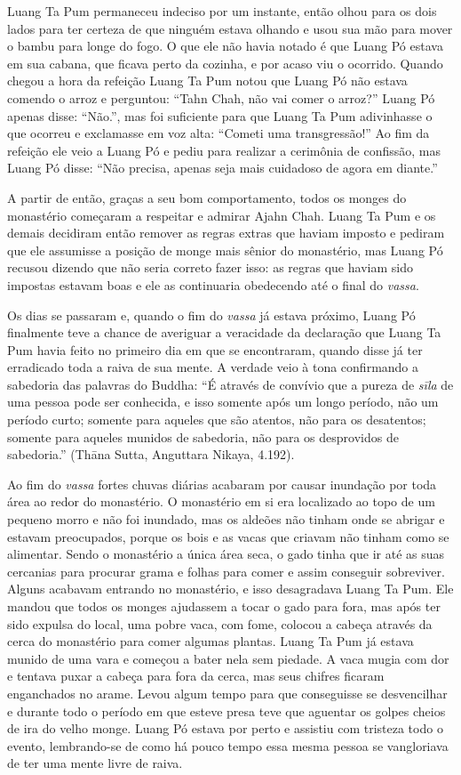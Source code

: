 Luang Ta Pum permaneceu indeciso por um instante, então olhou para os
dois lados para ter certeza de que ninguém estava olhando e usou sua mão
para mover o bambu para longe do fogo. O que ele não havia notado é que
Luang Pó estava em sua cabana, que ficava perto da cozinha, e por acaso
viu o ocorrido. Quando chegou a hora da refeição Luang Ta Pum notou que
Luang Pó não estava comendo o arroz e perguntou: ``Tahn Chah, não vai
comer o arroz?'' Luang Pó apenas disse: ``Não.'', mas foi suficiente
para que Luang Ta Pum adivinhasse o que ocorreu e exclamasse em voz
alta: ``Cometi uma transgressão!'' Ao fim da refeição ele veio a Luang
Pó e pediu para realizar a cerimônia de confissão, mas Luang Pó disse:
``Não precisa, apenas seja mais cuidadoso de agora em diante.''

A partir de então, graças a seu bom comportamento, todos os monges do
monastério começaram a respeitar e admirar Ajahn Chah. Luang Ta Pum e os
demais decidiram então remover as regras extras que haviam imposto e
pediram que ele assumisse a posição de monge mais sênior do monastério,
mas Luang Pó recusou dizendo que não seria correto fazer isso: as regras
que haviam sido impostas estavam boas e ele as continuaria obedecendo
até o final do \emph{vassa}.

Os dias se passaram e, quando o fim do \emph{vassa} já estava próximo,
Luang Pó finalmente teve a chance de averiguar a veracidade da
declaração que Luang Ta Pum havia feito no primeiro dia em que se
encontraram, quando disse já ter erradicado toda a raiva de sua mente. A
verdade veio à tona confirmando a sabedoria das palavras do Buddha: ``É
através de convívio que a pureza de \emph{sīla} de uma pessoa pode ser
conhecida, e isso somente após um longo período, não um período curto;
somente para aqueles que são atentos, não para os desatentos; somente
para aqueles munidos de sabedoria, não para os desprovidos de
sabedoria.'' (Thāna Sutta, Anguttara Nikaya, 4.192).

Ao fim do \emph{vassa} fortes chuvas diárias acabaram por causar
inundação por toda área ao redor do monastério. O monastério em si era
localizado ao topo de um pequeno morro e não foi inundado, mas os
aldeões não tinham onde se abrigar e estavam preocupados, porque os bois
e as vacas que criavam não tinham como se alimentar. Sendo o monastério
a única área seca, o gado tinha que ir até as suas cercanias para
procurar grama e folhas para comer e assim conseguir sobreviver. Alguns
acabavam entrando no monastério, e isso desagradava Luang Ta Pum. Ele
mandou que todos os monges ajudassem a tocar o gado para fora, mas após
ter sido expulsa do local, uma pobre vaca, com fome, colocou a cabeça
através da cerca do monastério para comer algumas plantas. Luang Ta Pum
já estava munido de uma vara e começou a bater nela sem piedade. A vaca
mugia com dor e tentava puxar a cabeça para fora da cerca, mas seus
chifres ficaram enganchados no arame. Levou algum tempo para que
conseguisse se desvencilhar e durante todo o período em que esteve presa
teve que aguentar os golpes cheios de ira do velho monge. Luang Pó
estava por perto e assistiu com tristeza todo o evento, lembrando-se de
como há pouco tempo essa mesma pessoa se vangloriava de ter uma mente
livre de raiva.

